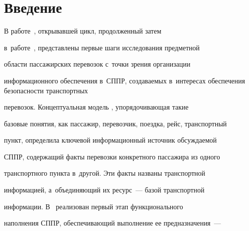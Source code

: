

















\thispagestyle{headings}










\section{Введение} %





В работе~\cite{1-bos}, открывавшей цикл, продолженный затем 


в~работе~\cite{2-bos}, пред\-став\-ле\-ны первые шаги исследования предметной 


об\-ласти пассажирских перевозок с~точ\-ки зрения организации 


информационного обеспечения в~СППР, соз\-да\-ва\-емых в~интересах обеспечения безопас\-ности транспортных 


перевозок. Концептуальная модель \cite{1-bos}, упорядочивающая такие 


базовые понятия, как пассажир, перевозчик, поездка, рейс, транспортный 


пункт, определила ключевой информационный источник обсуждаемой 


СППР, содержащий факты перевозки конкретного пассажира из одного 


транспортного пунк\-та в~другой. Эти факты названы транспортной 


информацией, а~объеди\-ня\-ющий их ресурс~--- базой транспортной 


информации. В~\cite{2-bos} реализован первый этап функционального 


наполнения СППР, обеспечивающий выполнение ее предназначения~--- 



